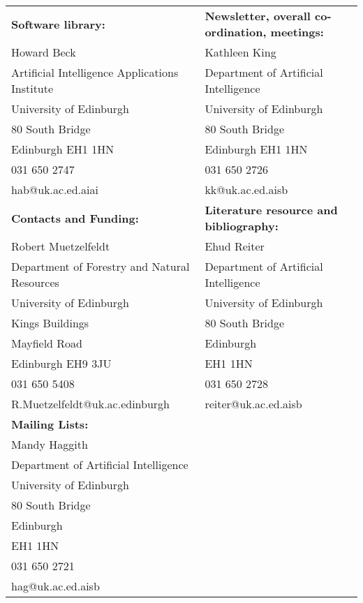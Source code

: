 \begin{tabular}{l|l}
{\bf Software library:} & {\bf Newsletter, overall co-ordination,
meetings:}\\ 
Howard Beck &  Kathleen King\\
Artificial Intelligence Applications Institute &  Department of
Artificial Intelligence \\
University of Edinburgh & University of Edinburgh\\
80 South Bridge & 80 South Bridge\\
Edinburgh EH1 1HN & Edinburgh EH1 1HN\\
031 650 2747 & 031 650 2726\\
hab@uk.ac.ed.aiai & kk@uk.ac.ed.aisb\\
\hline
{\bf Contacts and Funding:} & {\bf Literature resource and bibliography:} \\ 
Robert Muetzelfeldt & Ehud Reiter\\
Department of Forestry and Natural Resources &   Department of Artificial Intelligence\\
University of Edinburgh & University of Edinburgh\\
Kings Buildings & 80 South Bridge\\
 Mayfield Road &  Edinburgh\\
Edinburgh   EH9 3JU & EH1 1HN\\
 031 650 5408 & 031 650 2728\\
 R.Muetzelfeldt@uk.ac.edinburgh & reiter@uk.ac.ed.aisb\\
\hline
{\bf Mailing Lists:} &\\ 
Mandy Haggith & \\
Department of Artificial Intelligence &\\
University of Edinburgh &\\
80 South Bridge &\\
Edinburgh &\\
EH1 1HN &\\
031 650 2721\\
hag@uk.ac.ed.aisb &\\
\hline

\end{tabular}





